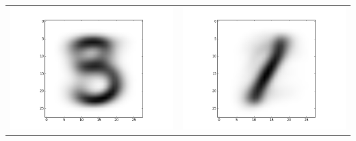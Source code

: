 \documentclass[11pt]{article}
\begin{document}
\begin{tabular}{cc}
\includegraphics[scale=0.4]{images/10-images/2} & \includegraphics[scale=0.4]{images/10-images/3}
\end{tabular}
\end{document}
